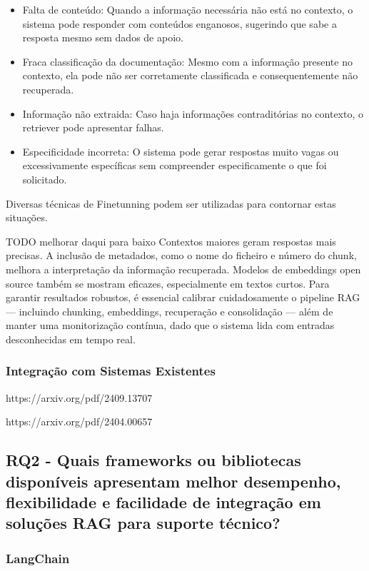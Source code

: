 \begin{itemize}
    \item Falta de conteúdo: Quando a informação necessária não está no contexto, o sistema pode responder com conteúdos enganosos, sugerindo que sabe a resposta mesmo sem dados de apoio.
    \item Fraca classificação da documentação: Mesmo com a informação presente no contexto, ela pode não ser corretamente classificada e consequentemente não recuperada. 
 \item Informação não extraida: Caso haja informações contraditórias no contexto, o retriever pode apresentar falhas.
  \item Especificidade incorreta: O sistema pode gerar respostas muito vagas ou excessivamente específicas sem compreender especificamente o que foi solicitado.
\end{itemize}

Diversas técnicas de Finetunning podem ser utilizadas para contornar estas situações.

TODO melhorar daqui para baixo
Contextos maiores geram respostas mais precisas. A inclusão de metadados, como o nome do ficheiro e número do chunk, melhora a interpretação da informação recuperada. Modelos de embeddings open source também se mostram eficazes, especialmente em textos curtos. Para garantir resultados robustos, é essencial calibrar cuidadosamente o pipeline RAG — incluindo chunking, embeddings, recuperação e consolidação — além de manter uma monitorização contínua, dado que o sistema lida com entradas desconhecidas em tempo real.



\subsubsection{Integração com Sistemas Existentes}




https://arxiv.org/pdf/2409.13707

https://arxiv.org/pdf/2404.00657


\subsection{RQ2 - Quais frameworks ou bibliotecas disponíveis apresentam melhor desempenho, flexibilidade e facilidade de integração em soluções RAG para suporte técnico?}


\subsubsection{LangChain}


